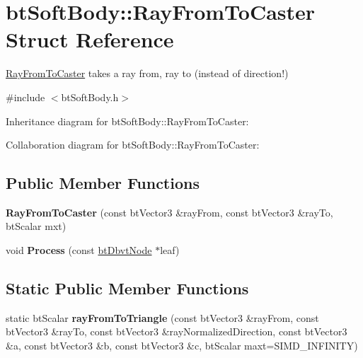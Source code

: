 \hypertarget{structbt_soft_body_1_1_ray_from_to_caster}{\section{bt\+Soft\+Body\+:\+:Ray\+From\+To\+Caster Struct Reference}
\label{structbt_soft_body_1_1_ray_from_to_caster}
}


\hyperlink{structbt_soft_body_1_1_ray_from_to_caster}{Ray\+From\+To\+Caster} takes a ray from, ray to (instead of direction!)  




{\ttfamily \#include $<$bt\+Soft\+Body.\+h$>$}



Inheritance diagram for bt\+Soft\+Body\+:\+:Ray\+From\+To\+Caster\+:


Collaboration diagram for bt\+Soft\+Body\+:\+:Ray\+From\+To\+Caster\+:
\subsection*{Public Member Functions}
\begin{DoxyCompactItemize}
\item 
\hypertarget{structbt_soft_body_1_1_ray_from_to_caster_a24b9d523391dbc0bc3e01b7dba4aaa13}{{\bfseries Ray\+From\+To\+Caster} (const bt\+Vector3 \&ray\+From, const bt\+Vector3 \&ray\+To, bt\+Scalar mxt)}\label{structbt_soft_body_1_1_ray_from_to_caster_a24b9d523391dbc0bc3e01b7dba4aaa13}

\item 
\hypertarget{structbt_soft_body_1_1_ray_from_to_caster_a621df5173379b16c357db2bdc0193b5a}{void {\bfseries Process} (const \hyperlink{structbt_dbvt_node}{bt\+Dbvt\+Node} $\ast$leaf)}\label{structbt_soft_body_1_1_ray_from_to_caster_a621df5173379b16c357db2bdc0193b5a}

\end{DoxyCompactItemize}
\subsection*{Static Public Member Functions}
\begin{DoxyCompactItemize}
\item 
\hypertarget{structbt_soft_body_1_1_ray_from_to_caster_a65b5c54f01dd39409b9b743982e8ef01}{static bt\+Scalar {\bfseries ray\+From\+To\+Triangle} (const bt\+Vector3 \&ray\+From, const bt\+Vector3 \&ray\+To, const bt\+Vector3 \&ray\+Normalized\+Direction, const bt\+Vector3 \&a, const bt\+Vector3 \&b, const bt\+Vector3 \&c, bt\+Scalar maxt=S\+I\+M\+D\+\_\+\+I\+N\+F\+I\+N\+I\+T\+Y)}\label{structbt_soft_body_1_1_ray_from_to_caster_a65b5c54f01dd39409b9b743982e8ef01}

\end{DoxyCompactItemize}
